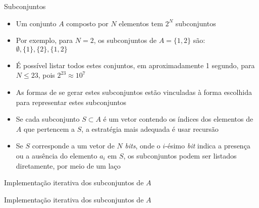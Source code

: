 \begin{frame}[fragile]{Subconjuntos}

    \begin{itemize}
        \item Um conjunto $A$ composto por $N$ elementos tem $2^N$ subconjuntos

        \item Por exemplo, para $N = 2$, os subconjuntos de $A = \lbrace 1, 2\rbrace$ são:
            $\emptyset, \lbrace 1\rbrace, \lbrace 2\rbrace, \lbrace 1, 2\rbrace$

        \item É possível listar todos estes conjuntos, em aproximadamente 1 segundo, para
            $N\leq 23$, pois $2^{23} \approx 10^7$

        \item As formas de se gerar estes subconjuntos estão vinculadas à forma escolhida para
            representar estes subconjuntos

        \item Se cada subconjunto $S\subset A$ é um vetor contendo os índices dos elementos de
            $A$ que pertencem a $S$, a estratégia mais adequada é usar recursão

        \item Se $S$ corresponde a um vetor de $N$ \textit{bits}, onde o $i$-ésimo \textit{bit}
            indica a presença ou a ausência do elemento $a_i$ em $S$, os subconjuntos podem ser
            listados diretamente, por meio de um laço 
    \end{itemize}

\end{frame}

\begin{frame}[fragile]{Implementação iterativa dos subconjuntos de $A$}
\end{frame}

\begin{frame}[fragile]{Implementação iterativa dos subconjuntos de $A$}
\end{frame}

